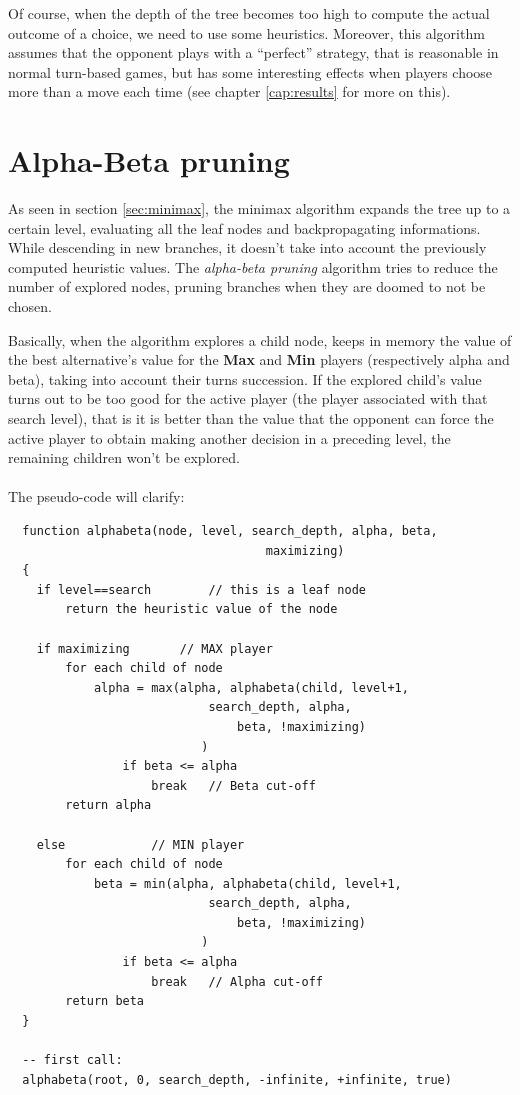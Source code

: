 Of course, when the depth of the tree becomes too high to compute the actual outcome of a choice, we need to use some heuristics. Moreover, this algorithm assumes that the opponent plays with a ``perfect'' strategy, that is reasonable in normal turn-based games, but has some interesting effects when players choose more than a move each time (see chapter \ref{cap:results} for more on this).

\section{Alpha-Beta pruning}
As seen in section \ref{sec:minimax}, the minimax algorithm expands the tree up to a certain level, evaluating all the leaf nodes and backpropagating informations.
While descending in new branches, it doesn't take into account the previously computed heuristic values.
The \textit{alpha-beta pruning} algorithm tries to reduce the number of explored nodes, pruning branches when they are doomed to not be chosen.

Basically, when the algorithm explores a child node, keeps in memory the value of the best alternative's value for the \textbf{Max} and \textbf{Min} players (respectively alpha and beta), taking into account their turns succession.
If the explored child's value turns out to be too good for the active player (the player associated with that search level), that is it is better than the value that the opponent can force the active player to obtain making another decision in a preceding level, the remaining children won't be explored.\\
\\
The pseudo-code will clarify:\\
{\footnotesize
\lstset{language=C}
\begin{lstlisting}
  function alphabeta(node, level, search_depth, alpha, beta,
                     				maximizing)
  {
    if level==search		// this is a leaf node
    	return the heuristic value of the node
    
    if maximizing		// MAX player
    	for each child of node
        	alpha = max(alpha, alphabeta(child, level+1,
                			search_depth, alpha,
                        		beta, !maximizing)
                           )
                if beta <= alpha
                	break	// Beta cut-off
        return alpha
        
    else			// MIN player
    	for each child of node
        	beta = min(alpha, alphabeta(child, level+1,
                			search_depth, alpha,
                        		beta, !maximizing)
                           )
                if beta <= alpha
                	break	// Alpha cut-off
        return beta
  }
  
  -- first call:
  alphabeta(root, 0, search_depth, -infinite, +infinite, true)
\end{lstlisting}
}

